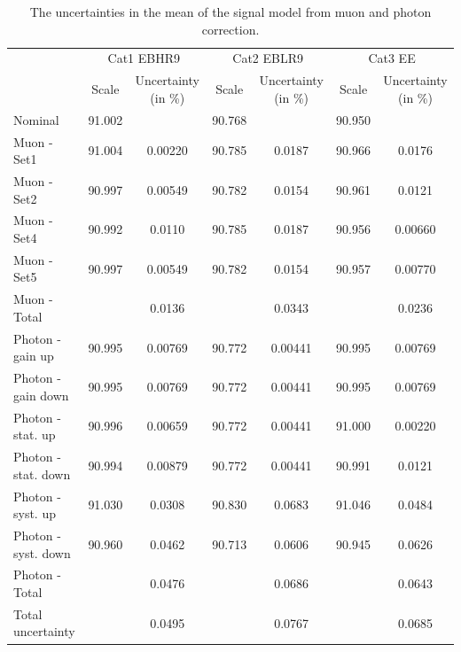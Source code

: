 	\begin{table}[!ht]
	\scriptsize
	    \begin{center}
	    \caption{The uncertainties in the mean of the signal model from muon and photon correction.}
	    \begin{tabular}{lcccccc}
	    \hline
	    & \multicolumn{2}{c}{Cat1 EBHR9} & \multicolumn{2}{c}{Cat2 EBLR9} & \multicolumn{2}{c}{Cat3 EE} \\
	    \cline{2-7}
	    & Scale & Uncertainty (in \%) & Scale & Uncertainty (in \%) & Scale & Uncertainty (in \%) \\
	      \hline
	      \hline
	      Nominal & 91.002 &  & 90.768 &  & 90.950 & \\
	      Muon - Set1 & 91.004 & 0.00220 & 90.785 & 0.0187 & 90.966 & 0.0176  \\
	      Muon - Set2 & 90.997 & 0.00549 & 90.782 & 0.0154 & 90.961 & 0.0121 \\
	      Muon - Set4 & 90.992 & 0.0110 & 90.785 & 0.0187 & 90.956 & 0.00660 \\
	      Muon - Set5 & 90.997 & 0.00549 & 90.782 & 0.0154 & 90.957 & 0.00770 \\
	      Muon - Total & & 0.0136 & & 0.0343 & & 0.0236 \\
	      \hline
	      Photon - gain up & 90.995& 0.00769 & 90.772 & 0.00441 & 90.995 & 0.00769 \\
	      Photon - gain down & 90.995& 0.00769 & 90.772 & 0.00441 & 90.995 & 0.00769 \\
	      Photon - stat. up & 90.996& 0.00659 & 90.772 & 0.00441 & 91.000 & 0.00220 \\
	      Photon - stat. down & 90.994& 0.00879 & 90.772 & 0.00441 & 90.991 & 0.0121 \\
	      Photon - syst. up & 91.030& 0.0308 & 90.830 & 0.0683 & 91.046 & 0.0484\\
	      Photon - syst. down & 90.960& 0.0462 & 90.713 & 0.0606 & 90.945 & 0.0626 \\
	      Photon - Total & & 0.0476 & & 0.0686 & & 0.0643\\
	      \hline
	      Total uncertainty & & 0.0495 & & 0.0767 & & 0.0685\\
	      \hline
	    \end{tabular}
	    \label{tab:UnMean}
	    \end{center}
	\end{table}
	
